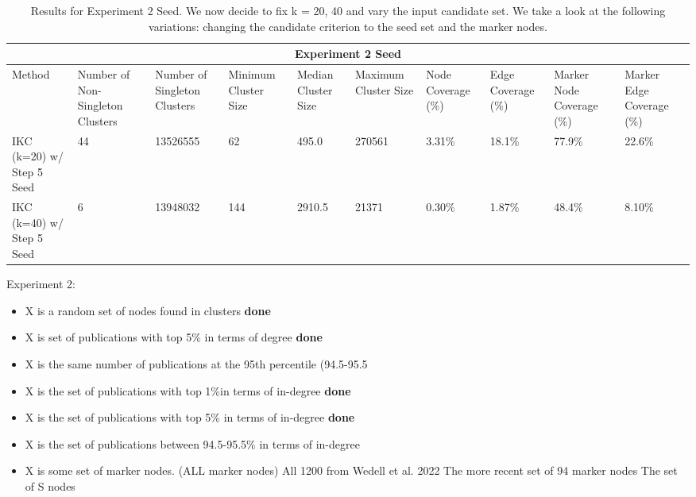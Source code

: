 \documentclass{article}
\begin{document}
\begin{table}[h!]
	\centering
	\begin{small}
		\begin{tabular}{ |p{0.95cm}||p{1.25cm}|p{1.25cm}||p{1.20cm}|p{1.20cm}|p{1.20cm}||p{1.25cm}|p{1.25cm}|| p{1.25cm}|p{1.25cm}| }
			\hline
			\multicolumn{10}{|c|}{Experiment 2 Seed} \\
			\hline
			Method & Number of Non-Singleton Clusters & Number of Singleton Clusters & Minimum Cluster Size &  Median Cluster Size & Maximum Cluster Size & Node Coverage (\%)& Edge Coverage  (\%)& Marker Node Coverage  (\%)& Marker Edge Coverage  (\%)\\
			\hline
			IKC (k=20)  w/ Step 5 Seed &  44    & \cellcolor{blue!20}13526555 &  \cellcolor{red!20} 62 & \cellcolor{red!20}495.0 &\cellcolor{red!20} 270561 & \cellcolor{red!20}3.31\% & \cellcolor{red!20}18.1\% & \cellcolor{red!20}77.9\% & \cellcolor{red!20}22.6\% \\ \hline
			
			IKC (k=40)  w/ Step 5 Seed  &  6    & \cellcolor{blue!20}13948032 &   \cellcolor{red!20}144 & \cellcolor{red!20}2910.5 & \cellcolor{red!20}21371 & \cellcolor{red!20}0.30\% &\cellcolor{red!20}1.87\% & \cellcolor{red!20}48.4\% & \cellcolor{red!20}8.10\% \\  \hline
			\hline
		\end{tabular}
	\end{small}
	\caption{Results for Experiment 2 Seed. We now decide to fix k = 20, 40 and vary the input candidate set. We take a look at the following variations:  changing the candidate criterion to the seed set and the marker nodes.}
	\label{table:expt2seed}
\end{table}

	
Experiment 2:
\begin{itemize}
	\item X is a random set of nodes found in clusters \textbf{done}
	\item X is set of publications with top 5$\%$ in terms of degree \textbf{done}
	\item X is the same number of publications at the 95th percentile (94.5-95.5%
	\item X is the set of publications with top 1$\%$in terms of in-degree \textbf{done}
	\item X is the set of publications with top 5$\%$ in terms of in-degree  \textbf{done}
	\item X is the set of publications between 94.5-95.5$\%$ in terms of in-degree
	\item X is some set of marker nodes. (ALL marker nodes)
		All 1200 from Wedell et al. 2022
		The more recent set of 94 marker nodes
		The set of S nodes
\end{itemize}
\end{document}
